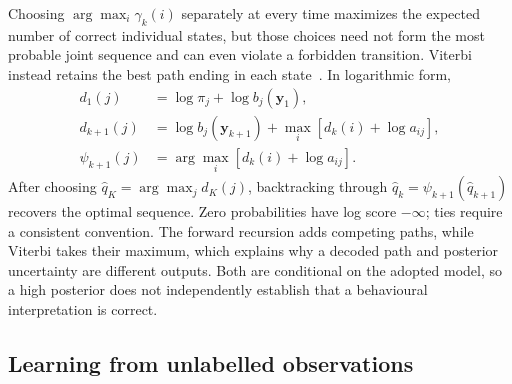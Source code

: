Choosing $\arg\max_i\gamma_k(i)$ separately at every time maximizes the expected number
of correct individual states, but those choices need not form the most probable joint
sequence and can even violate a forbidden transition. Viterbi instead retains the best
path ending in each state~\cite{viterbi1967,rabiner1989}. In logarithmic form,
\begin{align}
 d_1(j)&=\log\pi_j+\log b_j(\mathbf y_1),\\
 d_{k+1}(j)&=\log b_j(\mathbf y_{k+1})+
                    \max_i[d_k(i)+\log a_{ij}],\\
 \psi_{k+1}(j)&=\arg\max_i[d_k(i)+\log a_{ij}].
 \label{eq:viterbi-recursion}
\end{align}
After choosing $\widehat q_K=\arg\max_jd_K(j)$, backtracking through
$\widehat q_k=\psi_{k+1}(\widehat q_{k+1})$ recovers the optimal sequence. Zero
probabilities have log score $-\infty$; ties require a consistent convention.
The forward recursion adds competing paths, while Viterbi takes their maximum, which
explains why a decoded path and posterior uncertainty are different outputs. Both
are conditional on the adopted model, so a high posterior does not independently
establish that a behavioural interpretation is correct.

\subsection{Learning from unlabelled observations}

